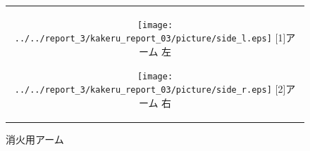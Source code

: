 \begin{figure}[h]
 \centering
 \begin{tabular}{c}

  \begin{minipage}{0.3\hsize}
   \centering
   \texttt{[image: ../../report\_3/kakeru\_report\_03/picture/side\_l.eps]}
   \hspace{1.6cm} [1]アーム 左
  \end{minipage}

  \begin{minipage}{0.45\hsize}
   \centering
   \texttt{[image: ../../report\_3/kakeru\_report\_03/picture/side\_r.eps]}
   \hspace{1.6cm} [2]アーム 右
  \end{minipage}
 \end{tabular}
 \caption{消火用アーム}
 \label{arm_real}
\end{figure}
